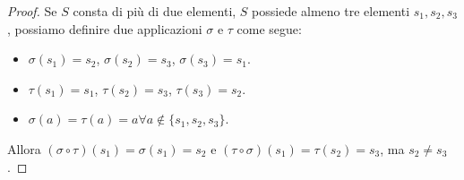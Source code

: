 \begin{proof}
    Se $S$ consta di più di due elementi, $S$ possiede almeno tre elementi $s_1, s_2, s_3$,
    possiamo definire due applicazioni $\sigma$ e $\tau$ come segue:

    \begin{itemize}
        \item $\sigma(s_1) = s_2$, $\sigma(s_2) = s_3$, $\sigma(s_3) = s_1$.
        \item $\tau(s_1) = s_1$, $\tau(s_2) = s_3$, $\tau(s_3) = s_2$.
        \item $\sigma(a) = \tau(a) = a \forall a \notin \{s_1, s_2, s_3\}$.
    \end{itemize}

    Allora $(\sigma \circ \tau)(s_1) = \sigma(s_1) = s_2$ e
    $(\tau \circ \sigma)(s_1) = \tau(s_2) = s_3$, ma $s_2 \neq s_3$.
\end{proof}
